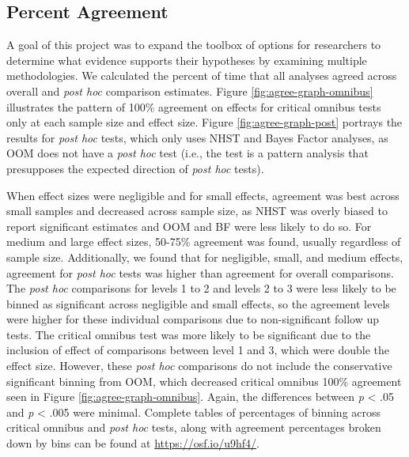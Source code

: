 \documentclass[english,man]{apa6}
\theoremstyle{definition}
\theoremstyle{definition}
\theoremstyle{definition}
\theoremstyle{remark}
\begin{document}
\subsection{Percent Agreement}\label{percent-agreement}

A goal of this project was to expand the toolbox of options for
researchers to determine what evidence supports their hypotheses by
examining multiple methodologies. We calculated the percent of time that
all analyses agreed across overall and \emph{post hoc} comparison
estimates. Figure \ref{fig:agree-graph-omnibus} illustrates the pattern
of 100\% agreement on effects for critical omnibus tests only at each
sample size and effect size. Figure \ref{fig:agree-graph-post} portrays
the results for \emph{post hoc} tests, which only uses NHST and Bayes
Factor analyses, as OOM does not have a \emph{post hoc} test (i.e., the
test is a pattern analysis that presupposes the expected direction of
\emph{post hoc} tests).

When effect sizes were negligible and for small effects, agreement was
best across small samples and decreased across sample size, as NHST was
overly biased to report significant estimates and OOM and BF were less
likely to do so. For medium and large effect sizes, 50-75\% agreement
was found, usually regardless of sample size. Additionally, we found
that for negligible, small, and medium effects, agreement for \emph{post
hoc} tests was higher than agreement for overall comparisons. The
\emph{post hoc} comparisons for levels 1 to 2 and levels 2 to 3 were
less likely to be binned as significant across negligible and small
effects, so the agreement levels were higher for these individual
comparisons due to non-significant follow up tests. The critical omnibus
test was more likely to be significant due to the inclusion of effect of
comparisons between level 1 and 3, which were double the effect size.
However, these \emph{post hoc} comparisons do not include the
conservative significant binning from OOM, which decreased critical
omnibus 100\% agreement seen in Figure \ref{fig:agree-graph-omnibus}.
Again, the differences between \emph{p} \textless{} .05 and \emph{p}
\textless{} .005 were minimal. Complete tables of percentages of binning
across critical omnibus and \emph{post hoc} tests, along with agreement
percentages broken down by bins can be found at
\url{https://osf.io/u9hf4/}.
\end{document}
